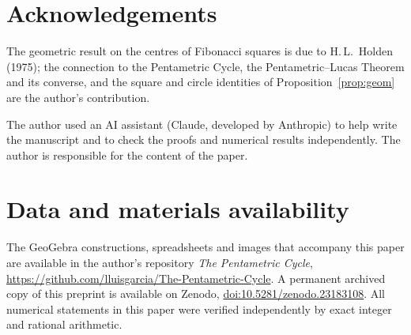 \documentclass[11pt,a4paper]{article}
\theoremstyle{plain}
\theoremstyle{definition}
\theoremstyle{remark}
\begin{document}
\section*{Acknowledgements}

The geometric result on the centres of Fibonacci squares is due to H.\,L.~Holden (1975); the connection to the Pentametric Cycle, the Pentametric–Lucas Theorem and its converse, and the square and circle identities of Proposition~\ref{prop:geom} are the author's contribution.

The author used an AI assistant (Claude, developed by Anthropic) to help write the manuscript and to check the proofs and numerical results independently. The author is responsible for the content of the paper.

\section*{Data and materials availability}

The GeoGebra constructions, spreadsheets and images that accompany this paper are available in the author's repository \emph{The Pentametric Cycle}, \url{https://github.com/lluisgarcia/The-Pentametric-Cycle}. A permanent archived copy of this preprint is available on Zenodo, \href{https://doi.org/10.5281/zenodo.23183108}{doi:10.5281/zenodo.23183108}. All numerical statements in this paper were verified independently by exact integer and rational arithmetic.
\end{document}
